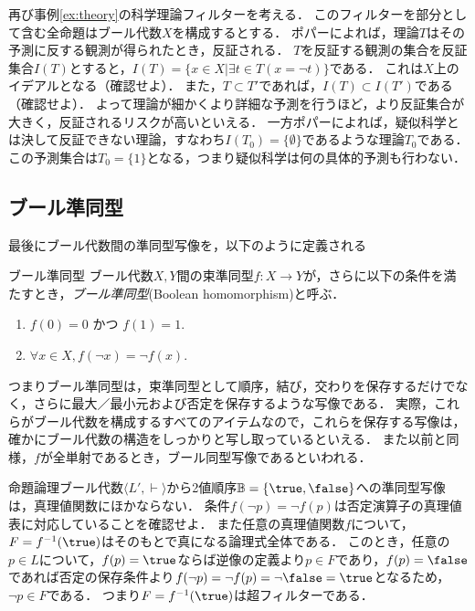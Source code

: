 \documentclass[11pt,a4paper, dvipdfmx]{jsarticle}
\begin{document}
\begin{example}[反証可能性]
    再び事例\ref{ex:theory}の科学理論フィルターを考える．
    このフィルターを部分として含む全命題はブール代数$X$を構成するとする．
    ポパーによれば，理論$T$はその予測に反する観測が得られたとき，反証される．
    $T$を反証する観測の集合を反証集合$I(T)$とすると，$I(T)=\{ x \in X | \exists t \in T (x = \neg t) \}$である．
    これは$X$上のイデアルとなる（確認せよ）．
    また，$T \subset T'$であれば，$I(T) \subset I(T')$である（確認せよ）．
    よって理論が細かくより詳細な予測を行うほど，より反証集合が大きく，反証されるリスクが高いといえる．
    一方ポパーによれば，疑似科学とは決して反証できない理論，すなわち$I(T_0)= \{ \emptyset \}$であるような理論$T_0$である．
    この予測集合は$T_0 = \{1\}$となる，つまり疑似科学は何の具体的予測も行わない．
\end{example}

\subsection{ブール準同型}

最後にブール代数間の準同型写像を，以下のように定義される

\begin{itembox}[l]{ブール準同型}
    ブール代数$X, Y$間の束準同型$f:X \to Y$が，さらに以下の条件を満たすとき，\emph{ブール準同型}(Boolean homomorphism)と呼ぶ．
    \begin{enumerate}
        \item $f(0) = 0$ かつ $f(1) = 1$.
        \item $\forall x \in X, f(\neg x) = \neg f(x) $.
    \end{enumerate}
\end{itembox}

つまりブール準同型は，束準同型として順序，結び，交わりを保存するだけでなく，さらに最大／最小元および否定を保存するような写像である．
実際，これらがブール代数を構成するすべてのアイテムなので，これらを保存する写像は，確かにブール代数の構造をしっかりと写し取っているといえる．
また以前と同様，$f$が全単射であるとき，ブール同型写像であるといわれる．

\begin{example}
命題論理ブール代数$\langle L', \vdash \rangle$から2値順序$\bbB = \{ \true, \false \}$への準同型写像は，真理値関数にほかならない．
条件$f( \neg p) = \neg f(p)$は否定演算子の真理値表に対応していることを確認せよ．
また任意の真理値関数$f$について，$F = f^{-1}(\true)$はそのもとで真になる論理式全体である．
このとき，任意の$p \in L$について，$f(p)=\true$ならば逆像の定義より$p \in F$であり，$f(p)=\false$であれば否定の保存条件より$f(\neg p) = \neg f(p) = \neg \false = \true$となるため，$\neg p \in F$である．
つまり$F = f^{-1}(\true)$は超フィルターである．
\end{example}
\end{document}
